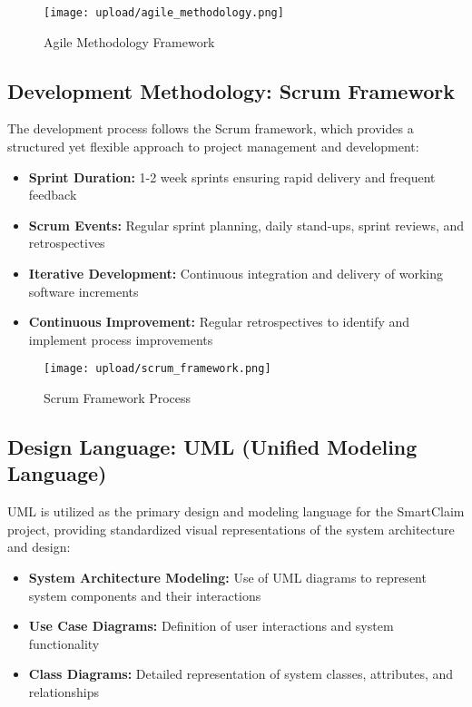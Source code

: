 \documentclass[12pt,a4paper]{report}
\begin{document}
\begin{figure}[H]
    \centering
    \texttt{[image: upload/agile\_methodology.png]}
    \caption{Agile Methodology Framework}
    \label{fig:agile}
\end{figure}

\subsection{Development Methodology: Scrum Framework}

The development process follows the Scrum framework, which provides a structured yet flexible approach to project management and development:

\begin{itemize}
    \item \textbf{Sprint Duration:} 1-2 week sprints ensuring rapid delivery and frequent feedback
    \item \textbf{Scrum Events:} Regular sprint planning, daily stand-ups, sprint reviews, and retrospectives
    
    \item \textbf{Iterative Development:} Continuous integration and delivery of working software increments
    \item \textbf{Continuous Improvement:} Regular retrospectives to identify and implement process improvements
\end{itemize}

\begin{figure}[H]
    \centering
    \texttt{[image: upload/scrum\_framework.png]}
    \caption{Scrum Framework Process}
    \label{fig:scrum}
\end{figure}

\subsection{Design Language: UML (Unified Modeling Language)}

UML is utilized as the primary design and modeling language for the SmartClaim project, providing standardized visual representations of the system architecture and design:

\begin{itemize}
    \item \textbf{System Architecture Modeling:} Use of UML diagrams to represent system components and their interactions
    \item \textbf{Use Case Diagrams:} Definition of user interactions and system functionality
    \item \textbf{Class Diagrams:} Detailed representation of system classes, attributes, and relationships
\end{itemize}
\end{document}
